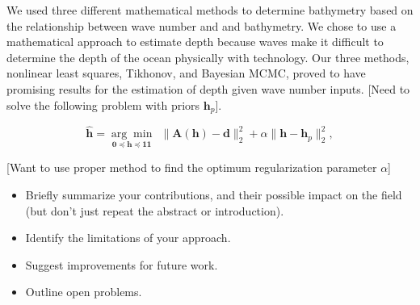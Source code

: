 We used three different mathematical methods to determine bathymetry based on the relationship between wave number and and bathymetry. We chose to use a mathematical approach to estimate depth because waves make it difficult to determine the depth of the ocean physically with technology. Our three methods, nonlinear least squares, Tikhonov, and Bayesian MCMC, proved to have promising results for the estimation of depth given wave number inputs. 
[Need to solve the following problem with priors $\mathbf{h}_p$].

\begin{equation}\label{LS-regBC}
\mathbf{\hat{h}} = \underset{\mathbf{0} \preceq \mathbf{h} \preceq \mathbf{11}}{\arg \min} \ \ \|  \mathbf{A}(\mathbf{h}) -  \mathbf{d} \|_2^2  +  \alpha \| \mathbf{h} -  \mathbf{h}_p\|_2^2,
\end{equation}

[Want to use proper method to find the optimum regularization parameter $\alpha$]

\begin{itemize}
\item Briefly summarize your contributions, and their possible
impact on the field (but don't just repeat the abstract or introduction).
\item Identify the limitations of your approach.
\item Suggest improvements for future work.
\item Outline open problems.
\end{itemize}

